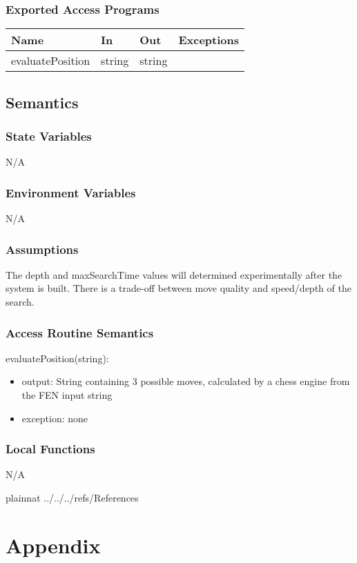 \documentclass[12pt, titlepage]{article}
\begin{document}
    \subsubsection{Exported Access Programs}
        \begin{center}
        \begin{tabular}{p{4cm} p{3cm} p{3cm} p{2.5cm}}
        \hline
        \textbf{Name} & \textbf{In} & \textbf{Out} & \textbf{Exceptions} \\
        \hline
        evaluatePosition & string & string & \\
        \hline
        \end{tabular}
        \end{center}

    \subsection{Semantics}
    \subsubsection{State Variables}
    N/A

    \subsubsection{Environment Variables}
    N/A

    \subsubsection{Assumptions}
    The depth and maxSearchTime values will determined experimentally after the system is built. 
    There is a trade-off between move quality and speed/depth of the search.

    \subsubsection{Access Routine Semantics}
        \noindent evaluatePosition(string):
        \begin{itemize}
            \item output: String containing 3 possible moves, calculated by a chess engine from the FEN input string
            \item exception: none
        \end{itemize}

    \subsubsection{Local Functions}
    N/A

\newpage

 {plainnat}
 {../../../refs/References}

\newpage

\section{Appendix} \label{Appendix}

\end{document}
